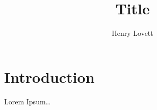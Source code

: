 \documentclass[12pt]{article}
\author{Henry Lovett}
\title{Title}
\begin{document}
\maketitle


\section{Introduction}
Lorem Ipsum\dots
\end{document}
